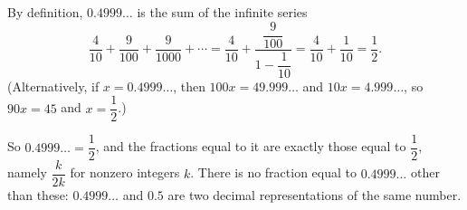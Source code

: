 By definition, $0.4999\ldots$ is the sum of the infinite series
\[\dfrac{4}{10}+\dfrac{9}{100}+\dfrac{9}{1000}+\cdots=\dfrac4{10}+\dfrac{\dfrac{9}{100}}{1-\dfrac1{10}}=\dfrac4{10}+\dfrac1{10}=\dfrac12.\]
(Alternatively, if $x=0.4999\ldots$, then $100x=49.999\ldots$ and $10x=4.999\ldots$, so $90x=45$ and $x=\dfrac12$.)

So $0.4999\ldots=\boxed{\dfrac12}$, and the fractions equal to it are exactly those equal to $\dfrac12$, namely $\dfrac{k}{2k}$ for nonzero integers $k$. There is no fraction equal to $0.4999\ldots$ other than these: $0.4999\ldots$ and $0.5$ are two decimal representations of the same number.
